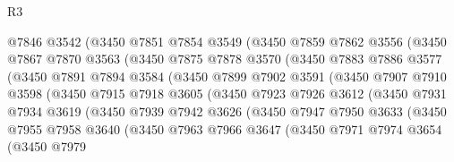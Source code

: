 \begin{lexlean}{R3}
\begin{coremodule}
                @7846
                @3542
                (@3450
                  @7851
                  @7854
                  @3549
                  (@3450
                    @7859
                    @7862
                    @3556
                    (@3450
                      @7867
                      @7870
                      @3563
                      (@3450
                        @7875
                        @7878
                        @3570
                        (@3450
                          @7883
                          @7886
                          @3577
                          (@3450
                            @7891
                            @7894
                            @3584
                            (@3450
                              @7899
                              @7902
                              @3591
                              (@3450
                                @7907
                                @7910
                                @3598
                                (@3450
                                  @7915
                                  @7918
                                  @3605
                                  (@3450
                                    @7923
                                    @7926
                                    @3612
                                    (@3450
                                      @7931
                                      @7934
                                      @3619
                                      (@3450
                                        @7939
                                        @7942
                                        @3626
                                        (@3450
                                          @7947
                                          @7950
                                          @3633
                                          (@3450
                                            @7955
                                            @7958
                                            @3640
                                            (@3450
                                              @7963
                                              @7966
                                              @3647
                                              (@3450
                                                @7971
                                                @7974
                                                @3654
                                                (@3450
                                                  @7979

\end{coremodule}
\end{lexlean}
